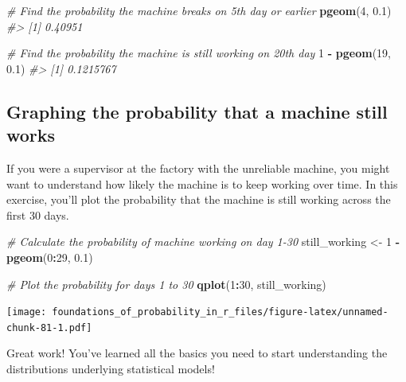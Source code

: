 \documentclass[]{article}
\newenvironment{Shaded}{\begin{snugshade}}{\end{snugshade}}
\newcommand{\CommentTok}[1]{\textcolor[rgb]{0.56,0.35,0.01}{\textit{#1}}}
\newcommand{\DecValTok}[1]{\textcolor[rgb]{0.00,0.00,0.81}{#1}}
\newcommand{\FloatTok}[1]{\textcolor[rgb]{0.00,0.00,0.81}{#1}}
\newcommand{\KeywordTok}[1]{\textcolor[rgb]{0.13,0.29,0.53}{\textbf{#1}}}
\newcommand{\NormalTok}[1]{#1}
\newcommand{\OperatorTok}[1]{\textcolor[rgb]{0.81,0.36,0.00}{\textbf{#1}}}
\newcommand{\StringTok}[1]{\textcolor[rgb]{0.31,0.60,0.02}{#1}}
\begin{document}
\begin{Shaded}
\begin{Highlighting}[]
\CommentTok{# Find the probability the machine breaks on 5th day or earlier}
\KeywordTok{pgeom}\NormalTok{(}\DecValTok{4}\NormalTok{, }\FloatTok{0.1}\NormalTok{)}
\CommentTok{#> [1] 0.40951}

\CommentTok{# Find the probability the machine is still working on 20th day}
\DecValTok{1} \OperatorTok{-}\StringTok{ }\KeywordTok{pgeom}\NormalTok{(}\DecValTok{19}\NormalTok{, }\FloatTok{0.1}\NormalTok{)}
\CommentTok{#> [1] 0.1215767}
\end{Highlighting}
\end{Shaded}

\hypertarget{graphing-the-probability-that-a-machine-still-works}{%
\subsection{Graphing the probability that a machine still
works}\label{graphing-the-probability-that-a-machine-still-works}}

If you were a supervisor at the factory with the unreliable machine, you
might want to understand how likely the machine is to keep working over
time. In this exercise, you'll plot the probability that the machine is
still working across the first 30 days.

\begin{Shaded}
\begin{Highlighting}[]
\CommentTok{# Calculate the probability of machine working on day 1-30}
\NormalTok{still_working <-}\StringTok{ }\DecValTok{1} \OperatorTok{-}\StringTok{ }\KeywordTok{pgeom}\NormalTok{(}\DecValTok{0}\OperatorTok{:}\DecValTok{29}\NormalTok{, }\FloatTok{0.1}\NormalTok{)}

\CommentTok{# Plot the probability for days 1 to 30}
\KeywordTok{qplot}\NormalTok{(}\DecValTok{1}\OperatorTok{:}\DecValTok{30}\NormalTok{, still_working)}
\end{Highlighting}
\end{Shaded}

\texttt{[image: foundations\_of\_probability\_in\_r\_files/figure-latex/unnamed-chunk-81-1.pdf]}

Great work! You've learned all the basics you need to start
understanding the distributions underlying statistical models!
\end{document}

